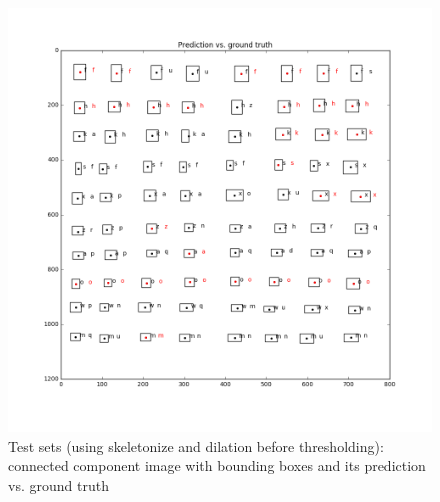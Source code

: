 \documentclass{extarticle}
\theoremstyle{definition}
\theoremstyle{definition}
\begin{document}
\begin{figure}[H]
	\includegraphics[width = 0.5\linewidth]{./figures/test2_gt_Prediction_vs_ground_truth_improve_dilation.png}	
	\caption{Test sets (using skeletonize and dilation before thresholding): connected component image with bounding boxes and its prediction vs. ground truth}
	\label{figure7}
\end{figure}
\end{document}
